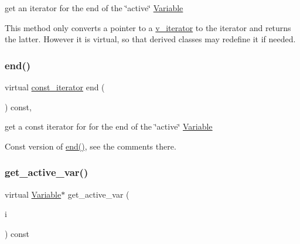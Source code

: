 get an iterator for the end of the \char`\"{}active\char`\"{} \mbox{\hyperlink{class_s_m_spp__di__unipi__it_1_1_variable}{Variable}} 

This method only converts a pointer to a \mbox{\hyperlink{class_s_m_spp__di__unipi__it_1_1_thin_var_dep_interface_1_1v__iterator}{v\+\_\+iterator}} to the iterator and returns the latter. However it is virtual, so that derived classes may redefine it if needed. \mbox{\label{group___thin_var_dep_interface___c_l_a_s_s_e_s_gabd4acdc34e7627e7740feff502da77e1}} 
\subsubsection{\texorpdfstring{end()}{end()}\hspace{0.1cm}{\footnotesize\ttfamily [2/2]}}
{\footnotesize\ttfamily virtual \mbox{\hyperlink{class_s_m_spp__di__unipi__it_1_1_thin_var_dep_interface_1_1const__iterator}{const\+\_\+iterator}} end (\begin{DoxyParamCaption}\item[{void}]{ }\end{DoxyParamCaption}) const\hspace{0.3cm}{\ttfamily [inline]}, {\ttfamily [virtual]}}



get a const iterator for for the end of the \char`\"{}active\char`\"{} \mbox{\hyperlink{class_s_m_spp__di__unipi__it_1_1_variable}{Variable}} 

Const version of \mbox{\hyperlink{group___thin_var_dep_interface___c_l_a_s_s_e_s_gae1175d5cbc6627e3e49ed9bcb58ffce9}{end()}}, see the comments there. \mbox{\label{group___thin_var_dep_interface___c_l_a_s_s_e_s_ga1967518603f9424434460d4ba8676c37}} 
\subsubsection{\texorpdfstring{get\+\_\+active\+\_\+var()}{get\_active\_var()}}
{\footnotesize\ttfamily virtual \mbox{\hyperlink{class_s_m_spp__di__unipi__it_1_1_variable}{Variable}}$\ast$ get\+\_\+active\+\_\+var (\begin{DoxyParamCaption}\item[{const \mbox{\hyperlink{group___thin_var_dep_interface___c_l_a_s_s_e_s_gad53d6229d7ec28555a9c9c2fd9abf773}{Index}}}]{i }\end{DoxyParamCaption}) const\hspace{0.3cm}{\ttfamily [pure virtual]}}



